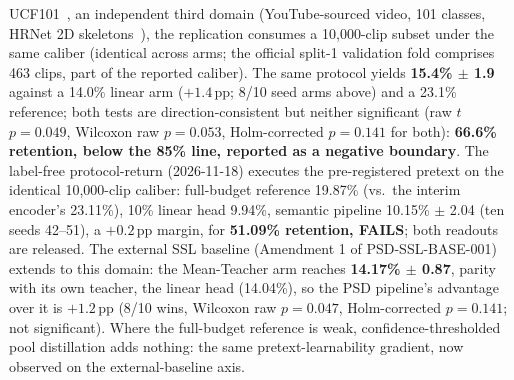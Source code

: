 UCF101~\citep{soomro2012ucf101}, an independent third domain (YouTube-sourced video, 101 classes, HRNet 2D skeletons~\citep{sun2019hrnet}), the replication consumes a 10{,}000-clip subset under the same caliber (identical across arms; the official split-1 validation fold comprises 463 clips, part of the reported caliber). The same protocol yields \textbf{15.4\% $\pm$ 1.9} against a 14.0\% linear arm ($+1.4$\,pp; 8/10 seed arms above) and a 23.1\% reference; both tests are direction-consistent but neither significant (raw $t$ $p=0.049$, Wilcoxon raw $p=0.053$, Holm-corrected $p=0.141$ for both): \textbf{66.6\% retention, below the 85\% line, reported as a negative boundary}. The label-free protocol-return (2026-11-18) executes the pre-registered pretext on the identical 10{,}000-clip caliber: full-budget reference 19.87\% (vs.\ the interim encoder's 23.11\%), 10\% linear head 9.94\%, semantic pipeline 10.15\% $\pm$ 2.04 (ten seeds 42--51), a $+0.2$\,pp margin, for \textbf{51.09\% retention, FAILS}; both readouts are released. The external SSL baseline (Amendment 1 of PSD-SSL-BASE-001) extends to this domain: the Mean-Teacher arm reaches \textbf{14.17\% $\pm$ 0.87}, parity with its own teacher, the linear head (14.04\%), so the PSD pipeline's advantage over it is $+1.2$\,pp (8/10 wins, Wilcoxon raw $p=0.047$, Holm-corrected $p=0.141$; not significant). Where the full-budget reference is weak, confidence-thresholded pool distillation adds nothing: the same pretext-learnability gradient, now observed on the external-baseline axis.

